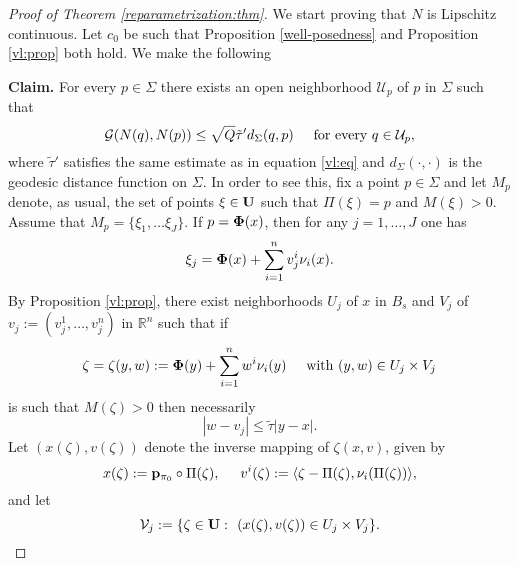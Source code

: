 \documentclass[a4paper,11pt,reqno]{amsart}
\theoremstyle{definition}
\numberwithin{equation}{section}
\numberwithin{subsection}{section}
\newcommand{\R}{\mathbb{R}}
\newcommand{\U}{\mathcal{U}}
\newcommand{\G}{\mathcal{G}}
\newcommand{\p}{\mathbf{p}}
\begin{document}
\begin{proof}[Proof of Theorem \ref{reparametrization:thm}]
We start proving that $N$ is Lipschitz continuous. Let $c_{0}$ be such that Proposition \ref{well-posedness} and Proposition \ref{vl:prop} both hold. We make the following

\hspace{0.5cm} \textbf{Claim.} For every $p \in \Sigma$ there exists an open neighborhood $\U_{p}$ of $p$ in $\Sigma$ such that
\begin{equation} \label{proof:claim}
\G(N(q), N(p)) \leq \sqrt{Q} \tilde{\tau}' d_{\Sigma}(q,p) \hspace{0.5cm} \mbox{for every } q \in \U_{p},
\end{equation}
where $\tilde{\tau}'$ satisfies the same estimate as in equation \eqref{vl:eq} and $d_{\Sigma}(\cdot, \cdot)$ is the geodesic distance function on $\Sigma$. In order to see this, fix a point $p \in \Sigma$ and let $M_{p}$ denote, as usual, the set of points $\xi \in {\bf U}$ such that $\Pi(\xi) = p$ and $M(\xi) > 0$. Assume that $M_{p} = \lbrace \xi_{1}, \dots \xi_{J} \rbrace$. If $p = {\bf \Phi}(x)$, then for any $j = 1,\dots,J$ one has
\begin{equation} \label{proof:1}
\xi_{j} = {\bf \Phi}(x) + \sum_{i=1}^{n} v_{j}^{i} \nu_{i}(x).
\end{equation}
By Proposition \ref{vl:prop}, there exist neighborhoods $U_{j}$ of $x$ in $B_{s}$ and $V_{j}$ of $v_{j} := \left( v_{j}^{1}, \dots, v_{j}^{n} \right)$ in $\R^{n}$ such that if 
\begin{equation} \label{proof:2}
\zeta = \zeta(y,w) := {\bf \Phi}(y) + \sum_{i=1}^{n} w^{i} \nu_{i}(y) \hspace{0.5cm} \mbox{with } (y,w) \in U_{j} \times V_{j}
\end{equation}
is such that $M(\zeta) > 0$ then necessarily
\begin{equation} \label{proof:3}
|w - v_{j}| \leq \tilde{\tau} |y - x|.
\end{equation}
Let $\left( x(\zeta), v(\zeta) \right)$ denote the inverse mapping of $\zeta(x,v)$, given by
\begin{equation} \label{proof:4}
x(\zeta) := \p_{\pi_{0}} \circ \Pi(\zeta), \hspace{0.5cm} v^{i}(\zeta) := \langle \zeta - \Pi(\zeta), \nu_{i}(\Pi(\zeta)) \rangle,
\end{equation}
and let
\begin{equation} \label{proof:5}
\mathcal{V}_{j} := \lbrace \zeta \in {\bf U} \, \colon \, \left( x(\zeta), v(\zeta) \right) \in U_{j} \times V_{j} \rbrace.

\end{equation}
\end{proof}
\end{document}
